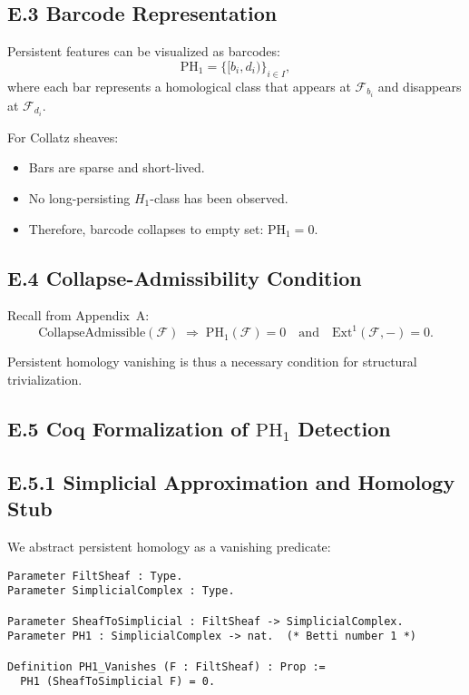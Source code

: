 \documentclass[11pt]{article}
\begin{document}
\subsection*{E.3 Barcode Representation}

Persistent features can be visualized as barcodes:
\[
\mathrm{PH}_1 = \{ [b_i, d_i) \}_{i \in I},
\]
where each bar represents a homological class that appears at \( \mathcal{F}_{b_i} \) and disappears at \( \mathcal{F}_{d_i} \).

For Collatz sheaves:
\begin{itemize}
  \item Bars are sparse and short-lived.
  \item No long-persisting \( H_1 \)-class has been observed.
  \item Therefore, barcode collapses to empty set: \( \mathrm{PH}_1 = 0 \).
\end{itemize}

\subsection*{E.4 Collapse-Admissibility Condition}

Recall from Appendix~A:
\[
\text{CollapseAdmissible}(\mathcal{F}) \;\Rightarrow\; \mathrm{PH}_1(\mathcal{F}) = 0 \quad \text{and} \quad \mathrm{Ext}^1(\mathcal{F}, -) = 0.
\]

Persistent homology vanishing is thus a necessary condition for structural trivialization.

\subsection*{E.5 Coq Formalization of \( \mathrm{PH}_1 \) Detection}

\subsection*{E.5.1 Simplicial Approximation and Homology Stub}

We abstract persistent homology as a vanishing predicate:

\begin{lstlisting}[language=Coq]
Parameter FiltSheaf : Type.
Parameter SimplicialComplex : Type.

Parameter SheafToSimplicial : FiltSheaf -> SimplicialComplex.
Parameter PH1 : SimplicialComplex -> nat.  (* Betti number 1 *)

Definition PH1_Vanishes (F : FiltSheaf) : Prop :=
  PH1 (SheafToSimplicial F) = 0.
\end{lstlisting}
\end{document}
